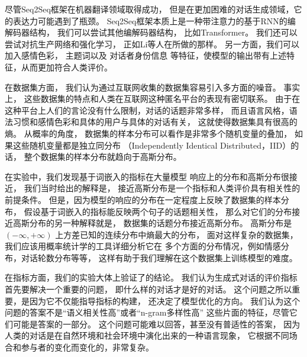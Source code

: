 尽管Seq2Seq框架在机器翻译领域取得成功，
但是在更加困难的对话生成领域，它的表达力可能遇到了瓶颈。
Seq2Seq框架本质上是一种带注意力的基于RNN的编解码器结构，
我们可以尝试其他编解码器结构，
比如Transformer。
我们还可以尝试对抗生产网络和强化学习，
正如Li等人在所做的那样。
另一方面，我们可以加入感情色彩，
主题词以及
对话者身份信息
等特征，使模型的输出带有上述特征，从而更加符合人类评价。

在数据集方面，
我们认为通过互联网收集的数据集容易引入多方面的噪音。
事实上，
这些数据集的特点和人类在互联网这种匿名平台的表现有密切联系。
由于在这种平台上人们的言论没有什么限制，对话的话题非常多样，
而且语言风格，语法习惯和感情色彩和具体的用户与具体的对话有关，
这就使得数据集具有很高的熵。
从概率的角度，
数据集的样本分布可以看作是非常多个随机变量的叠加，
如果这些随机变量都是独立同分布
（Independently Identical Distributed，IID）的话，
整个数据集的样本分布就趋向于高斯分布。

在实验中，我们发现基于词嵌入的指标在大量模型
响应上的分布和高斯分布很接近，
我们当时给出的解释是，
接近高斯分布是一个指标和人类评价具有相关性的前提条件。
但是，因为模型的响应的分布在一定程度上反映了数据集的样本分布，
假设基于词嵌入的指标能反映两个句子的话题相关性，
那么对它们的分布接近高斯分布的另一种解释就是，
数据集的话题分布接近高斯分布。
高斯分布是$(-\infty, +\infty)$
上方差已知的连续分布中熵最大的分布，
面对这样复杂的数据集，我们应该用概率统计学的工具详细分析它在
多个方面的分布情况，例如情感分布，对话轮数分布等等，
这样有助于我们理解在这个数据集上训练模型的难度。

在指标方面，我们的实验大体上验证了的结论。
我们认为生成式对话的评价指标首先要解决一个重要的问题，
即什么样的对话才是好的对话。
这个问题之所以重要，是因为它不仅能指导指标的构建，
还决定了模型优化的方向。
我们认为这个问题的答案不是“语义相关性高”或者“n-gram多样性高”
这些片面的特征，尽管它们可能是答案的一部分。
这个问题可能难以回答，甚至没有普适性的答案，
因为人类的对话是在自然环境和社会环境中演化出来的一种语言现象，
它根据不同场合和参与者的变化而变化的，非常复杂。

